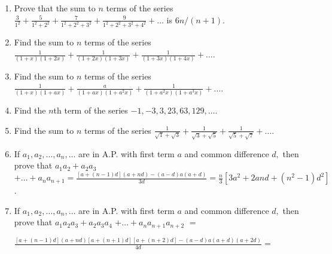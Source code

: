 \begin{enumerate}
\item Prove that the sum to $n$ terms of the series $\frac{3}{1^2} + \frac{5}{1^2 + 2^2} + \frac{7}{1^2 + 2^2 + 3^2} +
  \frac{9}{1^2 + 2^2 + 3^2 + 4^2} + \ldots$ is $6n/(n + 1)$.
\item Find the sum to $n$ terms of the series $\frac{1}{(1 + x)(1 + 2x)} + \frac{1}{(1 + 2x)(1 + 3x)} + \frac{1}{(1 +
  3x)(1 + 4x)} + \ldots$.
\item Find the sum to $n$ terms of the series $\frac{1}{(1 + x)(1 + ax)} + \frac{a}{(1 + ax)(1 + a^2x)} + \frac{1}{(1 +
  a^2x)(1 + a^3x)} + \ldots$.
\item Find the $n$th term of the series $-1, -3, 3, 23, 63, 129, \ldots$.
\item Find the sum to $n$ terms of the series $\frac{1}{\sqrt{1} + \sqrt{3}} + \frac{1}{\sqrt{3} + \sqrt{5}} +
  \frac{1}{\sqrt{5} + \sqrt{7}} + \ldots$.
\item If $a_1, a_2, \ldots, a_n, \ldots$ are in A.P. with first term $a$ and common difference $d,$ then prove that
  $a_1a_2 + a_2a_3$ $+ \ldots + a_na_{n +1} = \frac{[a + (n - 1)d](a + nd) - (a - d)a(a + d)}{3d} = \frac{n}{3}[3a^2 + 2and + (n^2
  - 1)d^2]$.
\item If $a_1, a_2, \ldots, a_n, \ldots$ are in A.P. with first term $a$ and common difference $d,$ then prove that
  $a_1a_2a_3 + a_2a_3a_4$ $+ \ldots + a_na_{n +1}a_{n + 2}$ $=$

  $\frac{[a + (n - 1)d](a + nd)[a + (n + 1)d][a + (n + 2)d] - (a -
  d)a(a + d)(a + 2d)}{4d}=$


\end{enumerate}

